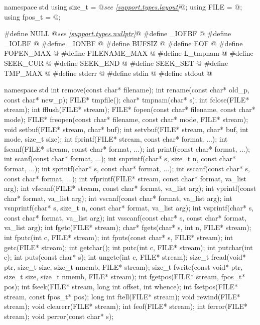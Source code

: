 \begin{codeblock}
namespace std {
  using size_t = @\textit{see \ref{support.types.layout}}@;
  using FILE = @\seebelow@;
  using fpos_t = @\seebelow@;
}

#define NULL @\textit{see \ref{support.types.nullptr}}@
#define _IOFBF @\seebelow@
#define _IOLBF @\seebelow@
#define _IONBF @\seebelow@
#define BUFSIZ @\seebelow@
#define EOF @\seebelow@
#define FOPEN_MAX @\seebelow@
#define FILENAME_MAX @\seebelow@
#define L_tmpnam @\seebelow@
#define SEEK_CUR @\seebelow@
#define SEEK_END @\seebelow@
#define SEEK_SET @\seebelow@
#define TMP_MAX @\seebelow@
#define stderr @\seebelow@
#define stdin @\seebelow@
#define stdout @\seebelow@

namespace std {
  int remove(const char* filename);
  int rename(const char* old_p, const char* new_p);
  FILE* tmpfile();
  char* tmpnam(char* s);
  int fclose(FILE* stream);
  int fflush(FILE* stream);
  FILE* fopen(const char* filename, const char* mode);
  FILE* freopen(const char* filename, const char* mode, FILE* stream);
  void setbuf(FILE* stream, char* buf);
  int setvbuf(FILE* stream, char* buf, int mode, size_t size);
  int fprintf(FILE* stream, const char* format, ...);
  int fscanf(FILE* stream, const char* format, ...);
  int printf(const char* format, ...);
  int scanf(const char* format, ...);
  int snprintf(char* s, size_t n, const char* format, ...);
  int sprintf(char* s, const char* format, ...);
  int sscanf(const char* s, const char* format, ...);
  int vfprintf(FILE* stream, const char* format, va_list arg);
  int vfscanf(FILE* stream, const char* format, va_list arg);
  int vprintf(const char* format, va_list arg);
  int vscanf(const char* format, va_list arg);
  int vsnprintf(char* s, size_t n, const char* format, va_list arg);
  int vsprintf(char* s, const char* format, va_list arg);
  int vsscanf(const char* s, const char* format, va_list arg);
  int fgetc(FILE* stream);
  char* fgets(char* s, int n, FILE* stream);
  int fputc(int c, FILE* stream);
  int fputs(const char* s, FILE* stream);
  int getc(FILE* stream);
  int getchar();
  int putc(int c, FILE* stream);
  int putchar(int c);
  int puts(const char* s);
  int ungetc(int c, FILE* stream);
  size_t fread(void* ptr, size_t size, size_t nmemb, FILE* stream);
  size_t fwrite(const void* ptr, size_t size, size_t nmemb, FILE* stream);
  int fgetpos(FILE* stream, fpos_t* pos);
  int fseek(FILE* stream, long int offset, int whence);
  int fsetpos(FILE* stream, const fpos_t* pos);
  long int ftell(FILE* stream);
  void rewind(FILE* stream);
  void clearerr(FILE* stream);
  int feof(FILE* stream);
  int ferror(FILE* stream);
  void perror(const char* s);
}
\end{codeblock}

